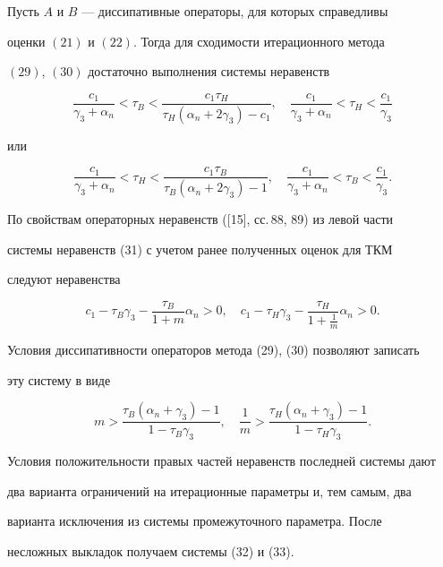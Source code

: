 \begin{thm} 


Пусть $A$ и $B$ --- диссипативные операторы, для которых справедливы 


оценки $(21)$ и $(22)$. Тогда для сходимости итерационного метода 


$(29)$, $(30)$ достаточно выполнения системы неравенств 


\begin{equation} 


\frac{c_1}{\gamma_3+\alpha_n}<\tau_B< 


\frac{c_1\tau_H}{\tau_H(\alpha_n+2\gamma_3)-c_1},\quad 


\frac{c_1}{\gamma_3+\alpha_n}<\tau_H<\frac{c_1}{\gamma_3} 


\end{equation} 


или 


\begin{equation} 


\frac{c_1}{\gamma_3+\alpha_n}<\tau_H< 


\frac{c_1\tau_B}{\tau_B(\alpha_n+2\gamma_3)-1},\quad 


\frac{c_1}{\gamma_3+\alpha_n}<\tau_B<\frac{c_1}{\gamma_3}. 


\end{equation} 


\end{thm}


 


\begin{pf} 


По свойствам операторных неравенств ([15], сс.\,88, 89) из левой части 


системы неравенств (31) с учетом ранее полученных оценок для ТКМ 


следуют неравенства 


$$ 


c_1-\tau_B\gamma_3-\frac{\tau_B}{1+m}\alpha_n>0,\quad 


c_1-\tau_H\gamma_3-\frac{\tau_H}{1+\frac{1}{m}}\alpha_n>0. 


$$ 


Условия диссипативности операторов метода (29), (30) позволяют записать 


эту систему в виде 


$$ 


m>\frac{\tau_B(\alpha_n+\gamma_3)-1}{1-\tau_B\gamma_3},\quad 


\frac{1}{m}>\frac{\tau_H(\alpha_n+\gamma_3)-1}{1-\tau_H\gamma_3}. 


$$ 


Условия положительности правых частей неравенств последней системы дают 


два варианта ограничений на итерационные параметры и, тем самым, два 


варианта исключения из системы промежуточного параметра. После 


несложных выкладок получаем системы (32) и (33). 


\end{pf} 


